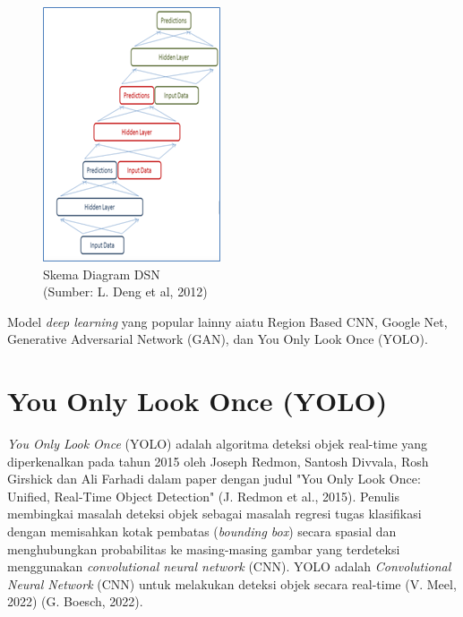 \begin{figure}[H]
	\vspace{-0.1cm}
	\begin{center}
		\includegraphics[width=0.4\columnwidth]{bab2/Gambar/Picture28.png}
	\end{center}
	\vspace{-0.2cm}
	\captionsetup{justification=centering}
	\caption{Skema Diagram DSN\\(Sumber: L. Deng et al, 2012)}\label{img:Skema-Diagram-DSN}
\end{figure}

Model \textit{deep learning} yang popular lainny aiatu Region Based CNN, Google Net, Generative Adversarial Network (GAN), dan You Only Look Once (YOLO).

\section{You Only Look Once (YOLO)}
\hspace{1,2cm}\textit{You Only Look Once} (YOLO) adalah algoritma deteksi objek real-time yang diperkenalkan pada tahun 2015 oleh Joseph Redmon, Santosh Divvala, Rosh Girshick dan Ali Farhadi dalam paper dengan judul "You Only Look Once: Unified, Real-Time Object Detection" (J. Redmon et al., 2015). Penulis membingkai masalah deteksi objek sebagai masalah regresi tugas klasifikasi dengan memisahkan kotak pembatas (\textit{bounding box}) secara spasial dan menghubungkan probabilitas ke masing-masing gambar yang terdeteksi menggunakan \textit{convolutional neural network} (CNN). YOLO adalah \textit{Convolutional Neural Network} (CNN) untuk melakukan deteksi objek secara real-time (V. Meel, 2022) (G. Boesch, 2022).

